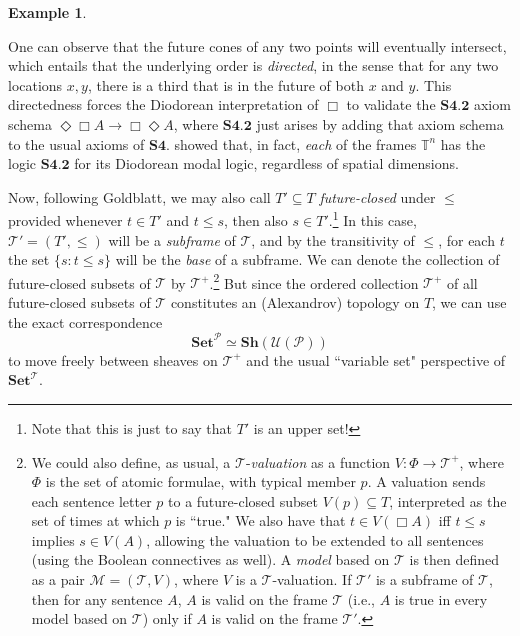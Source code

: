 \documentclass[a4paper]{book}
\theoremstyle{definition}
\newtheorem{example}{Example}[section]
\theoremstyle{definition}
\theoremstyle{definition}
\theoremstyle{theorem}
\theoremstyle{definition}
\begin{document}
\begin{example}
\begin{center}
	\end{center} \par \noindent 
	One can observe that the future cones of any two points will eventually intersect, which entails that the underlying order is \textit{directed}, in the sense that for any two locations $x, y$, there is a third that is in the future of both $x$ and $y$. This directedness forces the Diodorean interpretation of $\Box$ to validate the $\textbf{S4.2}$ axiom schema $\Diamond \Box A \rightarrow \Box \Diamond A$, where $\textbf{S4.2}$ just arises by adding that axiom schema to the usual axioms of $\textbf{S4}$. \cite{goldblatt_diodorean_1980} showed that, in fact, \textit{each} of the frames $\mathbb{T}^n$ has the logic $\textbf{S4.2}$ for its Diodorean modal logic, regardless of spatial dimensions.\par 
	Now, following Goldblatt, we may also call $T' \subseteq  T$ \textit{future-closed} under $\leq$ provided whenever $t \in T'$ and $t \leq s$, then also $s \in T'$.\footnote{Note that this is just to say that $T'$ is an upper set!} In this case, $\mathcal{T}' = (T', \leq)$ will be a \textit{subframe} of $\mathcal{T}$, and by the transitivity of $\leq$, for each $t$ the set $\{s: t \leq s\}$ will be the \textit{base} of a subframe. We can denote the collection of future-closed subsets of $\mathcal{T}$ by $\mathcal{T}^+$.\footnote{We could also define, as usual, a $\mathcal{T}$-\textit{valuation} as a function $V: \Phi \rightarrow \mathcal{T}^+$, where $\Phi$ is the set of atomic formulae, with typical member $p$. A valuation sends each sentence letter $p$ to a future-closed subset $V(p) \subseteq  T$, interpreted as the set of times at which $p$ is ``true." We also have that $t \in V(\Box A)$ iff $t \leq s$ implies $s \in V(A)$, allowing the valuation to be extended to all sentences (using the Boolean connectives as well). A \textit{model} based on $\mathcal{T}$ is then defined as a pair $\mathcal{M} = (\mathcal{T}, V)$, where $V$ is a $\mathcal{T}$-valuation. If $\mathcal{T}'$ is a subframe of $\mathcal{T}$, then for any sentence $A$, $A$ is valid on the frame $\mathcal{T}$ (i.e., $A$ is true in every model based on $\mathcal{T}$) only if $A$ is valid on the frame $\mathcal{T}'$.} 
	But since the ordered collection $\mathcal{T}^+$ of all future-closed subsets of $\mathcal{T}$ constitutes an (Alexandrov) topology on $T$, we can use the exact correspondence 
	\begin{equation*}
	\textbf{Set}^{\mathcal{P}} \simeq \textbf{Sh}(\mathcal{U}(\mathcal{P}))
	\end{equation*}
	 to move freely between sheaves on $\mathcal{T}^+$ and the usual ``variable set" perspective of $\textbf{Set}^{\mathcal{T}}$. 
\end{example}
\end{document}
